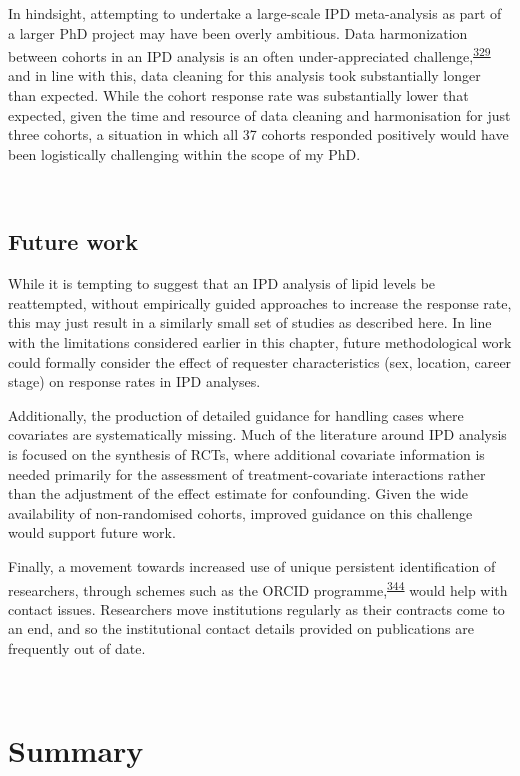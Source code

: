 \documentclass[a4paper, twoside]{templates/ociamthesis}
\begin{document}
In hindsight, attempting to undertake a large-scale IPD meta-analysis as part of a larger PhD project may have been overly ambitious. Data harmonization between cohorts in an IPD analysis is an often under-appreciated challenge,\textsuperscript{\protect\hyperlink{ref-levis2021}{329}} and in line with this, data cleaning for this analysis took substantially longer than expected. While the cohort response rate was substantially lower that expected, given the time and resource of data cleaning and harmonisation for just three cohorts, a situation in which all 37 cohorts responded positively would have been logistically challenging within the scope of my PhD.

~

\hypertarget{future-work}{%
\subsection{Future work}\label{future-work}}

While it is tempting to suggest that an IPD analysis of lipid levels be reattempted, without empirically guided approaches to increase the response rate, this may just result in a similarly small set of studies as described here. In line with the limitations considered earlier in this chapter, future methodological work could formally consider the effect of requester characteristics (sex, location, career stage) on response rates in IPD analyses.

Additionally, the production of detailed guidance for handling cases where covariates are systematically missing. Much of the literature around IPD analysis is focused on the synthesis of RCTs, where additional covariate information is needed primarily for the assessment of treatment-covariate interactions rather than the adjustment of the effect estimate for confounding. Given the wide availability of non-randomised cohorts, improved guidance on this challenge would support future work.

Finally, a movement towards increased use of unique persistent identification of researchers, through schemes such as the ORCID programme,\textsuperscript{\protect\hyperlink{ref-nature2009}{344}} would help with contact issues. Researchers move institutions regularly as their contracts come to an end, and so the institutional contact details provided on publications are frequently out of date.

~

\hypertarget{summary-5}{%
\section{Summary}\label{summary-5}}
\end{document}
